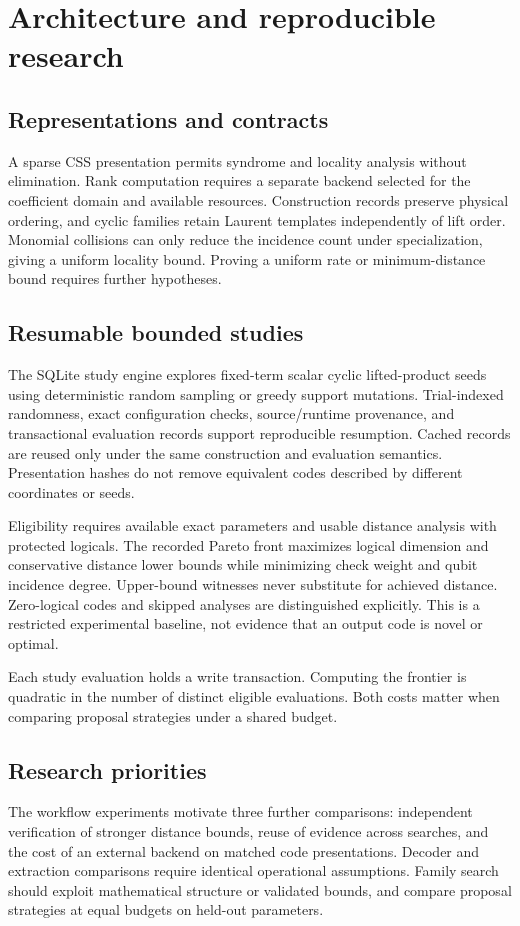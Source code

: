 \section{Architecture and reproducible research}

\subsection{Representations and contracts}
A sparse CSS presentation permits syndrome and locality analysis without
elimination. Rank computation requires a separate backend selected for the
coefficient domain and available resources. Construction records preserve
physical ordering, and cyclic families retain Laurent templates independently
of lift order. Monomial collisions can only reduce the incidence count under
specialization, giving a uniform locality bound. Proving a uniform rate or
minimum-distance bound requires further hypotheses.

\subsection{Resumable bounded studies}
The SQLite study engine explores fixed-term scalar cyclic lifted-product
seeds using deterministic random sampling or greedy support mutations.
Trial-indexed randomness, exact configuration checks, source/runtime
provenance, and transactional evaluation records support reproducible
resumption. Cached records are reused only under the same construction
and evaluation semantics. Presentation hashes do not remove equivalent
codes described by different coordinates or seeds.

Eligibility requires available exact parameters and usable distance
analysis with protected logicals. The recorded Pareto front maximizes
logical dimension and conservative distance lower bounds while minimizing
check weight and qubit incidence degree. Upper-bound witnesses never
substitute for achieved distance. Zero-logical codes and skipped analyses
are distinguished explicitly. This is a restricted experimental baseline,
not evidence that an output code is novel or optimal.

Each study evaluation holds a write transaction. Computing the frontier is
quadratic in the number of distinct eligible evaluations. Both costs matter
when comparing proposal strategies under a shared budget.

\subsection{Research priorities}
The workflow experiments motivate three further comparisons: independent
verification of stronger distance bounds, reuse of evidence across searches,
and the cost of an external backend on matched code presentations. Decoder
and extraction comparisons require identical operational assumptions. Family search
should exploit mathematical structure or validated bounds, and compare
proposal strategies at equal budgets on held-out parameters.

